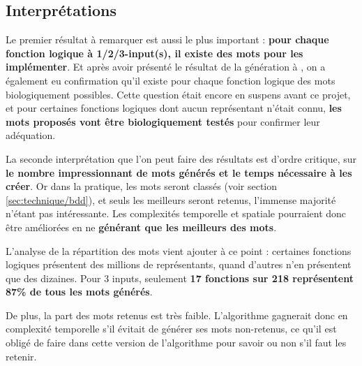 \subsection{Interprétations}
\label{subsec:logic_to_mot/resultats/interpretations}
\par
Le premier résultat à remarquer est aussi le plus important : \textbf{pour chaque fonction logique à 1/2/3-input(s), il existe des mots pour les implémenter}. Et après avoir présenté le résultat de la génération à , on a également eu confirmation qu'il existe pour chaque fonction logique des mots biologiquement possibles. Cette question était encore en suspens avant ce projet, et pour certaines fonctions logiques dont aucun représentant n'était connu, \textbf{les mots proposés vont être biologiquement testés} pour confirmer leur adéquation.
\par
La seconde interprétation que l'on peut faire des résultats est d'ordre critique, sur \textbf{le nombre impressionnant de mots générés et le temps nécessaire à les créer}. Or dans la pratique, les mots seront classés (voir section \ref{sec:technique/bdd}), et seuls les meilleurs seront retenus, l'immense majorité n'étant pas intéressante. Les complexités temporelle et spatiale pourraient donc être améliorées en ne \textbf{générant que les meilleurs des mots}.
\par
L'analyse de la répartition des mots vient ajouter à ce point : certaines fonctions logiques présentent des millions de représentants, quand d'autres n'en présentent que des dizaines. Pour 3 inputs, seulement \textbf{17 fonctions sur 218 représentent 87\% de tous les mots générés}.
\par
De plus, la part des mots retenus est très faible. L'algorithme gagnerait donc en complexité temporelle s'il évitait de générer ses mots non-retenus, ce qu'il est obligé de faire dans cette version de l'algorithme pour savoir ou non s'il faut les retenir.